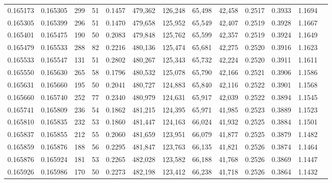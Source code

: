 \begin{tabular}{rrrrrrrrrrrrr}
0.165173 & 0.165305 &   299 &  51 &                                     0.1457 & 479,362 & 126,248 &  65,498 &  42,458 & 0.2517 & 0.3933 & 1.1694 \\
0.165305 & 0.165399 &   296 &  51 &                                     0.1470 & 479,658 & 125,952 &  65,549 &  42,407 & 0.2519 & 0.3928 & 1.1667 \\
0.165401 & 0.165475 &   190 &  50 &                                     0.2083 & 479,848 & 125,762 &  65,599 &  42,357 & 0.2519 & 0.3924 & 1.1649 \\
0.165479 & 0.165533 &   288 &  82 &                                     0.2216 & 480,136 & 125,474 &  65,681 &  42,275 & 0.2520 & 0.3916 & 1.1623 \\
0.165533 & 0.165547 &   131 &  51 &                                     0.2802 & 480,267 & 125,343 &  65,732 &  42,224 & 0.2520 & 0.3911 & 1.1611 \\
0.165550 & 0.165630 &   265 &  58 &                                     0.1796 & 480,532 & 125,078 &  65,790 &  42,166 & 0.2521 & 0.3906 & 1.1586 \\
0.165631 & 0.165660 &   195 &  50 &                                     0.2041 & 480,727 & 124,883 &  65,840 &  42,116 & 0.2522 & 0.3901 & 1.1568 \\
0.165660 & 0.165740 &   252 &  77 &                                     0.2340 & 480,979 & 124,631 &  65,917 &  42,039 & 0.2522 & 0.3894 & 1.1545 \\
0.165741 & 0.165809 &   236 &  54 &                                     0.1862 & 481,215 & 124,395 &  65,971 &  41,985 & 0.2523 & 0.3889 & 1.1523 \\
0.165810 & 0.165835 &   232 &  53 &                                     0.1860 & 481,447 & 124,163 &  66,024 &  41,932 & 0.2525 & 0.3884 & 1.1501 \\
0.165837 & 0.165855 &   212 &  55 &                                     0.2060 & 481,659 & 123,951 &  66,079 &  41,877 & 0.2525 & 0.3879 & 1.1482 \\
0.165859 & 0.165876 &   188 &  56 &                                     0.2295 & 481,847 & 123,763 &  66,135 &  41,821 & 0.2526 & 0.3874 & 1.1464 \\
0.165876 & 0.165924 &   181 &  53 &                                     0.2265 & 482,028 & 123,582 &  66,188 &  41,768 & 0.2526 & 0.3869 & 1.1447 \\
0.165926 & 0.165986 &   170 &  50 &                                     0.2273 & 482,198 & 123,412 &  66,238 &  41,718 & 0.2526 & 0.3864 & 1.1432 \\

\end{tabular}
